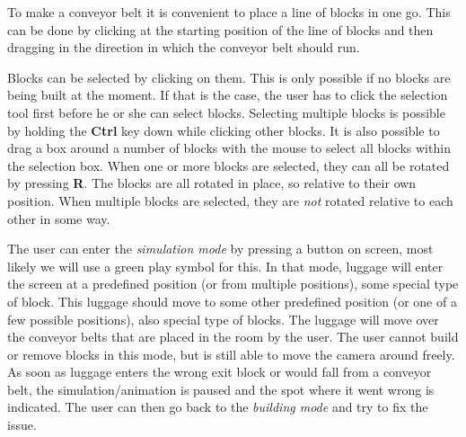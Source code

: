 To make a conveyor belt it is convenient to place a line of blocks in one go. This can be done by clicking at the starting position of the line of blocks and then dragging in the direction in which the conveyor belt should run.

Blocks can be selected by clicking on them. This is only possible if no blocks are being built at the moment. If that is the case, the user has to click the selection tool first before he or she can select blocks. Selecting multiple blocks is possible by holding the \textbf{Ctrl} key down while clicking other blocks. It is also possible to drag a box around a number of blocks with the mouse to select all blocks within the selection box. When one or more blocks are selected, they can all be rotated by pressing \textbf{R}. The blocks are all rotated in place, so relative to their own position. When multiple blocks are selected, they are \emph{not} rotated relative to each other in some way.

The user can enter the \textit{simulation mode} by pressing a button on screen, most likely we will use a green play symbol for this. In that mode, luggage will enter the screen at a predefined position (or from multiple positions), some special type of block. This luggage should move to some other predefined position (or one of a few possible positions), also special type of blocks. The luggage will move over the conveyor belts that are placed in the room by the user. The user cannot build or remove blocks in this mode, but is still able to move the camera around freely. As soon as luggage enters the wrong exit block or would fall from a conveyor belt, the simulation/animation is paused and the spot where it went wrong is indicated. The user can then go back to the \textit{building mode} and try to fix the issue.